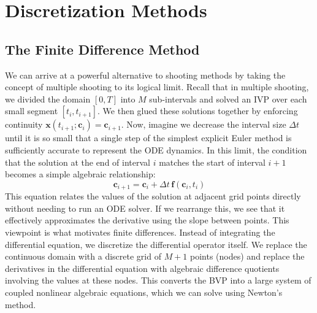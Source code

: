 \section{Discretization Methods}

\subsection{The Finite Difference Method}

We can arrive at a powerful alternative to shooting methods by taking the concept of multiple shooting to its logical limit. Recall that in multiple shooting, we divided the domain $[0, T]$ into $M$ sub-intervals and solved an IVP over each small segment $[t_i, t_{i+1}]$. We then glued these solutions together by enforcing continuity $\mathbf{x}(t_{i+1}; \mathbf{c}_i) = \mathbf{c}_{i+1}$. Now, imagine we decrease the interval size $\Delta t$ until it is so small that a single step of the simplest explicit Euler method is sufficiently accurate to represent the ODE dynamics. In this limit, the condition that the solution at the end of interval $i$ matches the start of interval $i+1$ becomes a simple algebraic relationship:
\begin{equation}
    \mathbf{c}_{i+1} = \mathbf{c}_i + \Delta t \, \mathbf{f}(\mathbf{c}_i, t_i)
\end{equation}
This equation relates the values of the solution at adjacent grid points directly without needing to run an ODE solver. If we rearrange this, we see that it effectively approximates the derivative using the slope between points. This viewpoint is what motivates finite differences. Instead of integrating the differential equation, we discretize the differential operator itself. We replace the continuous domain with a discrete grid of $M+1$ points (nodes) and replace the derivatives in the differential equation with algebraic difference quotients involving the values at these nodes. This converts the BVP into a large system of coupled nonlinear algebraic equations, which we can solve using Newton's method.

